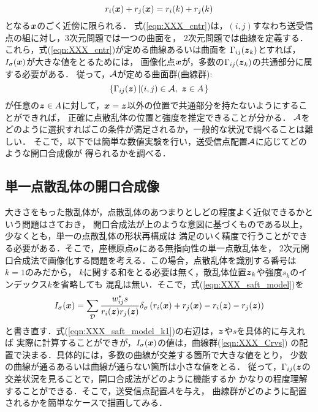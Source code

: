 \begin{equation}
	r_i(\mbox{\boldmath $x$})+r_j(\mbox{\boldmath $x$})=r_i(k)+r_j(k)
	\label{eqn:XXX_cntr}
\end{equation}
となる$\mbox{\boldmath $x$}$のごく近傍に限られる．
式(\ref{eqn:XXX_cntr})は，$(i,j)$すなわち送受信点の組に対し，3次元問題では一つの曲面を，
2次元問題では曲線を定義する．これら，式(\ref{eqn:XXX_cntr})が定める曲線あるいは曲面を
$\Gamma_{ij}(\mbox{\boldmath $z$}_k)$とすれば，$I_\sigma(\mbox{\boldmath $x$})$が大きな値をとるためには，
画像化点$\mbox{\boldmath $x$}$が，多数の$\Gamma_{ij}(\mbox{\boldmath $z$}_k)$の共通部分に属する必要がある．
従って，$\cal A$が定める曲面群(曲線群):
\begin{equation}
	\left\{ \Gamma_{ij}(\mbox{\boldmath $z$})\left|  (i,j)\in {\cal A} ,\,\, \mbox{\boldmath $z$} \in A \right.\right\}
	\label{eqn:XXX_Crvs}
\end{equation}
が任意の$\mbox{\boldmath $z$}\in A$に対して，$\mbox{\boldmath $x$}=\mbox{\boldmath $z$}$以外の位置で共通部分を持たないようにすることができれば，
正確に点散乱体の位置と強度を推定できることが分かる．
$\cal A$をどのように選択すればこの条件が満足されるか，一般的な状況で調べることは難しい．
そこで，以下では簡単な数値実験を行い，送受信点配置$\cal A$に応じてどのような開口合成像が
得られるかを調べる．
\subsection{単一点散乱体の開口合成像}
大きさをもった散乱体が，点散乱体のあつまりとしどの程度よく近似できるかという問題はさておき，
開口合成法が上のような意図に基づくものである以上，少なくとも，単一の点散乱体の形状再構成は
満足のいく精度で行うことができる必要がある．そこで，座標原点$\mbox{\boldmath $o$}$にある無指向性の単一点散乱体を，
2次元開口合成法で画像化する問題を考える．この場合，点散乱体を識別する番号は$k=1$のみだから，
$k$に関する和をとる必要は無く，散乱体位置$\mbox{\boldmath $z$}_k$や強度$s_k$のインデックス$k$を省略しても
混乱は無い．そこで，式(\ref{eqn:XXX_saft_model})を
\begin{equation}
	I_\sigma(\mbox{\boldmath $x$})
		=
	\sum_{\cal D} 
	\frac{w_{ij}^*s}{r_i(\mbox{\boldmath $z$})r_j(\mbox{\boldmath $z$})} 
	\delta_\sigma\left(r_i(\mbox{\boldmath $x$})+r_j(\mbox{\boldmath $x$})-r_i(\mbox{\boldmath $z$})-r_j(\mbox{\boldmath $z$})\right) 
	\label{eqn:XXX_saft_model_k1}
\end{equation}
と書き直す．式(\ref{eqn:XXX_saft_model_k1})の右辺は，$\mbox{\boldmath $z$}$や$s$を具体的に与えれば
実際に計算することができが，$I_\sigma(\mbox{\boldmath $x$})$の値は，曲線群(\ref{eqn:XXX_Crvs})
の配置で決まる．具体的には，多数の曲線が交差する箇所で大きな値をとり，
少数の曲線が通るあるいは曲線が通らない箇所は小さな値をとる．
従って，$\Gamma_{ij}(\mbox{\boldmath $z$}$の交差状況を見ることで，開口合成法がどのように機能するか
かなりの程度理解することができる．そこで，送受信点配置$\cal A$を与え，
曲線群がどのように配置されるかを簡単なケースで描画してみる．

